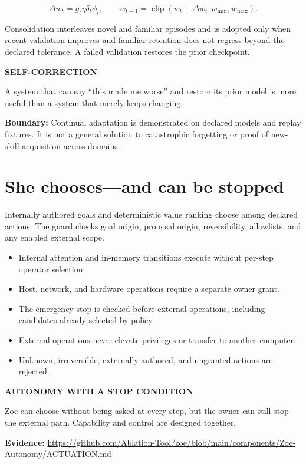 \documentclass[11pt]{article}
\newcommand{\card}[2]{\colorbox{ZoeLight}{\parbox{0.94\textwidth}{\small\textbf{\color{ZoeCyan!50!black}#1}\par\smallskip #2\par}}}
\newcommand{\boundary}[1]{\par\smallskip\small\color{ZoeGray}\textbf{Boundary:} #1\normalsize\par\smallskip}
\newcommand{\evidence}[1]{\par\smallskip\small\color{ZoeGray}\textbf{Evidence:} #1\normalsize\par\smallskip}
\begin{document}
\begin{equation}
\Delta w_t=g_t\eta\delta_t\phi_t,\qquad w_{t+1}=\operatorname{clip}(w_t+\Delta w_t,w_{\min},w_{\max}).
\end{equation}

Consolidation interleaves novel and familiar episodes and is adopted only when recent validation improves and familiar retention does not regress beyond the declared tolerance. A failed validation restores the prior checkpoint.

\card{SELF-CORRECTION}{A system that can say ``this made me worse'' and restore its prior model is more useful than a system that merely keeps changing.}

\boundary{Continual adaptation is demonstrated on declared models and replay fixtures. It is not a general solution to catastrophic forgetting or proof of new-skill acquisition across domains.}

\clearpage
\section{She chooses—and can be stopped}

Internally authored goals and deterministic value ranking choose among declared actions. The guard checks goal origin, proposal origin, reversibility, allowlists, and any enabled external scope.

\begin{itemize}
  \item Internal attention and in-memory transitions execute without per-step operator selection.
  \item Host, network, and hardware operations require a separate owner grant.
  \item The emergency stop is checked before external operations, including candidates already selected by policy.
  \item External operations never elevate privileges or transfer to another computer.
  \item Unknown, irreversible, externally authored, and ungranted actions are rejected.
\end{itemize}

\card{AUTONOMY WITH A STOP CONDITION}{Zoe can choose without being asked at every step, but the owner can still stop the external path. Capability and control are designed together.}

\evidence{\url{https://github.com/Ablation-Tool/zoe/blob/main/components/Zoe-Autonomy/ACTUATION.md}}
\end{document}
